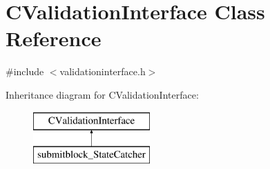 \hypertarget{class_c_validation_interface}{}\section{C\+Validation\+Interface Class Reference}
\label{class_c_validation_interface}


{\ttfamily \#include $<$validationinterface.\+h$>$}

Inheritance diagram for C\+Validation\+Interface\+:\begin{figure}[H]
\begin{center}
\leavevmode
\includegraphics[height=2.000000cm]{class_c_validation_interface}
\end{center}
\end{figure}

